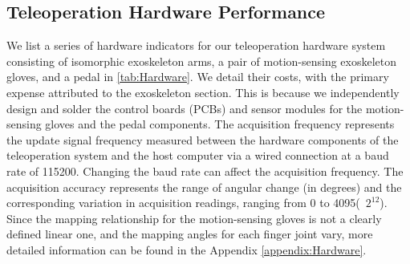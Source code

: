 \subsection{Teleoperation Hardware Performance}
\begin{table}[!ht]
    \centering
    \caption{Hardware Indicators of three component of the hardware system.(Freq.:frequency, Acc.:accuracy)}
    \label{tab:Hardware}
\end{table}
We list a series of hardware indicators for our teleoperation hardware system consisting of isomorphic exoskeleton arms, a pair of motion-sensing exoskeleton gloves, and a pedal in \cref{tab:Hardware}. We detail their costs, with the primary expense attributed to the exoskeleton section. This is because we independently design and solder the control boards (PCBs) and sensor modules for the motion-sensing gloves and the pedal components. The acquisition frequency represents the update signal frequency measured between the hardware components of the teleoperation system and the host computer via a wired connection at a baud rate of 115200. Changing the baud rate can affect the acquisition frequency. The acquisition accuracy represents the range of angular change (in degrees) and the corresponding variation in acquisition readings, ranging from 0 to 4095(~$2^{12}$). Since the mapping relationship for the motion-sensing gloves is not a clearly defined linear one, and the mapping angles for each finger joint vary, more detailed information can be found in the Appendix \ref{appendix:Hardware}.

